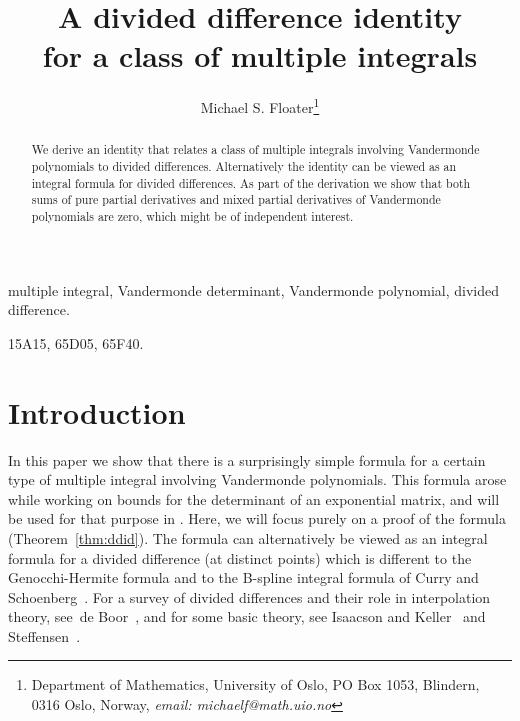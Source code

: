\documentclass[12pt]{article}
\begin{document}
\title{A divided difference identity \\
      for a class of multiple integrals}
\author{
Michael S. Floater\footnote{
Department of Mathematics,
University of Oslo,
PO Box 1053, Blindern,
0316 Oslo,
Norway,
{\it email: michaelf@math.uio.no}}
}                                                                               
                                                                                
\maketitle

\begin{abstract}
We derive an identity that relates a class of
multiple integrals involving Vandermonde polynomials to divided differences.
Alternatively the identity can be viewed as an integral
formula for divided differences.
As part of the derivation we show that
both sums of pure partial derivatives and mixed partial derivatives of
Vandermonde polynomials are zero,
which might be of independent interest.
\end{abstract}

 multiple integral,
Vandermonde determinant, Vandermonde polynomial, divided difference.

\smallskip

15A15, %
65D05, %
65F40. %

\section{Introduction}
In this paper we show that there is a surprisingly simple formula
for a certain type of multiple integral involving
Vandermonde polynomials.
This formula arose while working on bounds for the determinant
of an exponential matrix, and will be used for that
purpose in \cite{Floater:2026b}.
Here, we will focus purely on a proof of the formula
(Theorem~\ref{thm:ddid}).
The formula can alternatively be viewed as an integral
formula for a divided difference (at distinct points)
which is different to the
Genocchi-Hermite formula and to the B-spline integral formula of
Curry and Schoenberg~\cite{CurrySchoenberg:1966}.
For a survey of divided differences and their role
in interpolation theory, see~de Boor~\cite{deBoor:2005},
and for some basic theory, see
Isaacson and Keller~\cite[Section 6.1]{Isaacson:1994}
and Steffensen~\cite{Steffensen:1927}.
\end{document}
